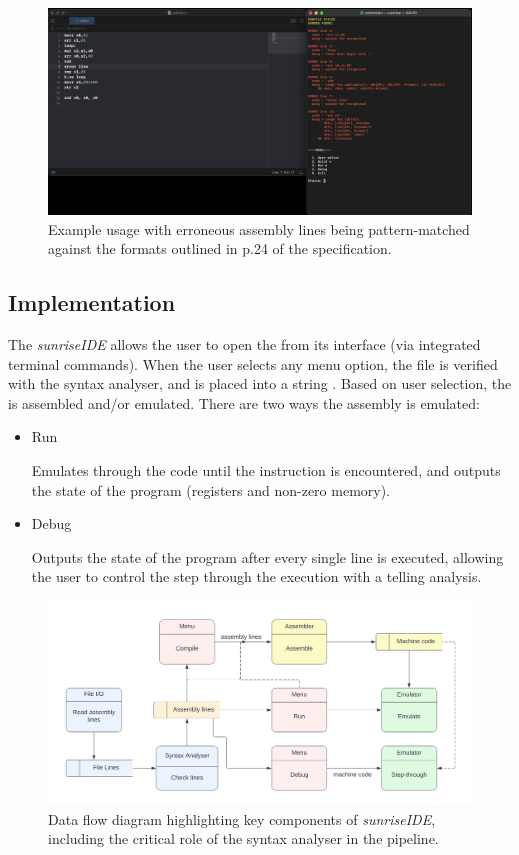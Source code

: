 \documentclass[11pt]{article}
\begin{document}
\begin{figure}[h]
  \centering
  \includegraphics[scale=0.9,width=14cm]{example_use.png}
  \caption{Example usage with erroneous assembly lines being pattern-matched against the formats outlined in p.24 of the specification.}
\end{figure}

\newpage
\subsection{Implementation}
The {\it sunriseIDE} allows the user to open the  from its interface (via integrated terminal commands). When the user selects any menu option, the file is verified with the syntax analyser, and is placed into a string . Based on user selection, the  is assembled and/or emulated.
There are two ways the assembly  is emulated:
\begin{itemize}
    \item Run
    
    Emulates through the code until the  instruction is encountered, and outputs the state of the program (registers and non-zero memory).
    \item Debug
    
    Outputs the state of the program after every single line is executed, allowing the user to control the step through the execution with a telling analysis.
\end{itemize}

\begin{figure}[h]
  \centering
  \includegraphics[scale=0.9,width=14cm]{data_flow.png}
  \caption{Data flow diagram highlighting key components of {\it sunriseIDE}, including the critical role of the syntax analyser in the pipeline.}
\end{figure}
\end{document}
